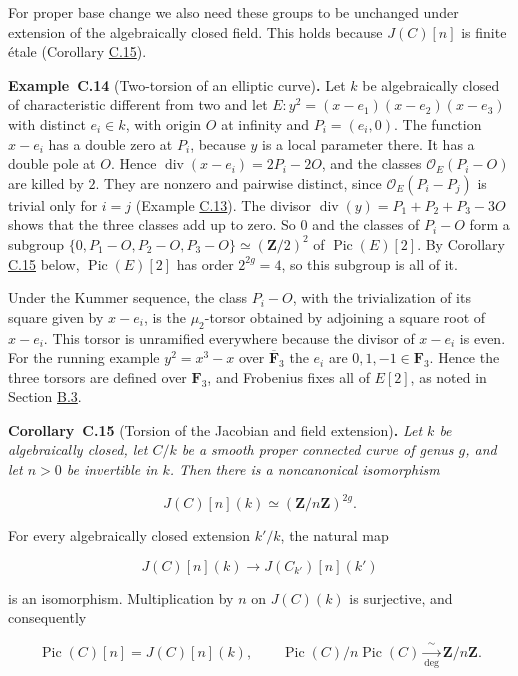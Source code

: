 \documentclass[11pt]{article}
\newenvironment{bpstatement}[2]{\par\addvspace{0.6\baselineskip}\noindent\textbf{#1}#2\textbf{.}\enspace\ignorespaces}
  {\par\addvspace{0.4\baselineskip}}
\newenvironment{bpstatementit}[2]{\begin{bpstatement}{#1}{#2}\itshape\ignorespaces}{\end{bpstatement}}
\begin{document}
For proper base change we also need these groups to be unchanged under extension of the algebraically closed field. This holds because \(J(C)[n]\) is finite étale (Corollary \hyperref[bp163]{C.15}).

\label{bp162}%
\begin{bpstatement}{Example~C.14}{ (Two-torsion of an elliptic curve)}
Let \(k\) be algebraically closed of characteristic different from two and let \(E\colon y^2=(x-e_1)(x-e_2)(x-e_3)\) with distinct \(e_i\in k\), with origin \(O\) at infinity and \(P_i=(e_i,0)\). The function \(x-e_i\) has a double zero at \(P_i\), because \(y\) is a local parameter there. It has a double pole at \(O\). Hence \(\operatorname{div}(x-e_i)=2P_i-2O\), and the classes \(\mathcal O_E(P_i-O)\) are killed by \(2\). They are nonzero and pairwise distinct, since \(\mathcal O_E(P_i-P_j)\) is trivial only for \(i=j\) (Example \hyperref[bp159]{C.13}). The divisor \(\operatorname{div}(y)=P_1+P_2+P_3-3O\) shows that the three classes add up to zero. So \(0\) and the classes of \(P_i-O\) form a subgroup \(\{0,P_1-O,P_2-O,P_3-O\}\simeq(\mathbf Z/2)^2\) of \(\operatorname{Pic}(E)[2]\). By Corollary \hyperref[bp163]{C.15} below, \(\operatorname{Pic}(E)[2]\) has order \(2^{2g}=4\), so this subgroup is all of it.

Under the Kummer sequence, the class \(P_i-O\), with the trivialization of its square given by \(x-e_i\), is the \(\mu_2\)-torsor obtained by adjoining a square root of \(x-e_i\). This torsor is unramified everywhere because the divisor of \(x-e_i\) is even. For the running example \(y^2=x^3-x\) over \(\overline{\mathbf F}_3\) the \(e_i\) are \(0,1,-1\in\mathbf F_3\). Hence the three torsors are defined over \(\mathbf F_3\), and Frobenius fixes all of \(E[2]\), as noted in Section \hyperref[bp111]{B.3}.
\end{bpstatement}

\label{bp163}%
\begin{bpstatementit}{Corollary~C.15}{ (Torsion of the Jacobian and field extension)}
Let \(k\) be algebraically closed, let \(C/k\) be a smooth proper connected curve of genus \(g\), and let \(n>0\) be invertible in \(k\). Then there is a noncanonical isomorphism

\[
J(C)[n](k)\simeq(\mathbf Z/n\mathbf Z)^{2g}.
\]

For every algebraically closed extension \(k'/k\), the natural map

\[
J(C)[n](k)\longrightarrow J(C_{k'})[n](k')
\]

is an isomorphism. Multiplication by \(n\) on \(J(C)(k)\) is surjective, and consequently

\[
\operatorname{Pic}(C)[n]=J(C)[n](k),
\qquad
\operatorname{Pic}(C)/n\operatorname{Pic}(C)
\xrightarrow[\deg]{\ \sim\ }\mathbf Z/n\mathbf Z.
\]
\end{bpstatementit}
\end{document}
